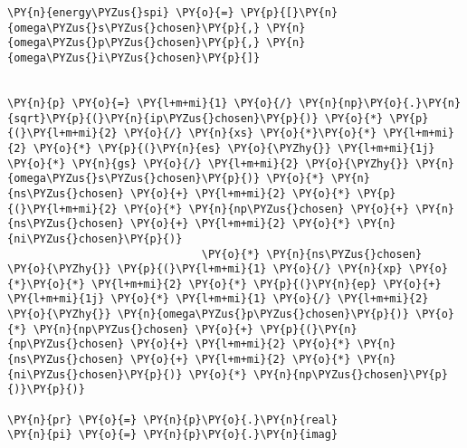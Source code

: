 \begin{Verbatim}[commandchars=\\\{\}]
\PY{n}{energy\PYZus{}spi} \PY{o}{=} \PY{p}{[}\PY{n}{omega\PYZus{}s\PYZus{}chosen}\PY{p}{,} \PY{n}{omega\PYZus{}p\PYZus{}chosen}\PY{p}{,} \PY{n}{omega\PYZus{}i\PYZus{}chosen}\PY{p}{]}


\PY{n}{p} \PY{o}{=} \PY{l+m+mi}{1} \PY{o}{/} \PY{n}{np}\PY{o}{.}\PY{n}{sqrt}\PY{p}{(}\PY{n}{ip\PYZus{}chosen}\PY{p}{)} \PY{o}{*} \PY{p}{(}\PY{l+m+mi}{2} \PY{o}{/} \PY{n}{xs} \PY{o}{*}\PY{o}{*} \PY{l+m+mi}{2} \PY{o}{*} \PY{p}{(}\PY{n}{es} \PY{o}{\PYZhy{}} \PY{l+m+mi}{1j} \PY{o}{*} \PY{n}{gs} \PY{o}{/} \PY{l+m+mi}{2} \PY{o}{\PYZhy{}} \PY{n}{omega\PYZus{}s\PYZus{}chosen}\PY{p}{)} \PY{o}{*} \PY{n}{ns\PYZus{}chosen} \PY{o}{+} \PY{l+m+mi}{2} \PY{o}{*} \PY{p}{(}\PY{l+m+mi}{2} \PY{o}{*} \PY{n}{np\PYZus{}chosen} \PY{o}{+} \PY{n}{ns\PYZus{}chosen} \PY{o}{+} \PY{l+m+mi}{2} \PY{o}{*} \PY{n}{ni\PYZus{}chosen}\PY{p}{)}
                              \PY{o}{*} \PY{n}{ns\PYZus{}chosen} \PY{o}{\PYZhy{}} \PY{p}{(}\PY{l+m+mi}{1} \PY{o}{/} \PY{n}{xp} \PY{o}{*}\PY{o}{*} \PY{l+m+mi}{2} \PY{o}{*} \PY{p}{(}\PY{n}{ep} \PY{o}{+} \PY{l+m+mi}{1j} \PY{o}{*} \PY{l+m+mi}{1} \PY{o}{/} \PY{l+m+mi}{2} \PY{o}{\PYZhy{}} \PY{n}{omega\PYZus{}p\PYZus{}chosen}\PY{p}{)} \PY{o}{*} \PY{n}{np\PYZus{}chosen} \PY{o}{+} \PY{p}{(}\PY{n}{np\PYZus{}chosen} \PY{o}{+} \PY{l+m+mi}{2} \PY{o}{*} \PY{n}{ns\PYZus{}chosen} \PY{o}{+} \PY{l+m+mi}{2} \PY{o}{*} \PY{n}{ni\PYZus{}chosen}\PY{p}{)} \PY{o}{*} \PY{n}{np\PYZus{}chosen}\PY{p}{)}\PY{p}{)}

\PY{n}{pr} \PY{o}{=} \PY{n}{p}\PY{o}{.}\PY{n}{real}
\PY{n}{pi} \PY{o}{=} \PY{n}{p}\PY{o}{.}\PY{n}{imag}



\end{Verbatim}
